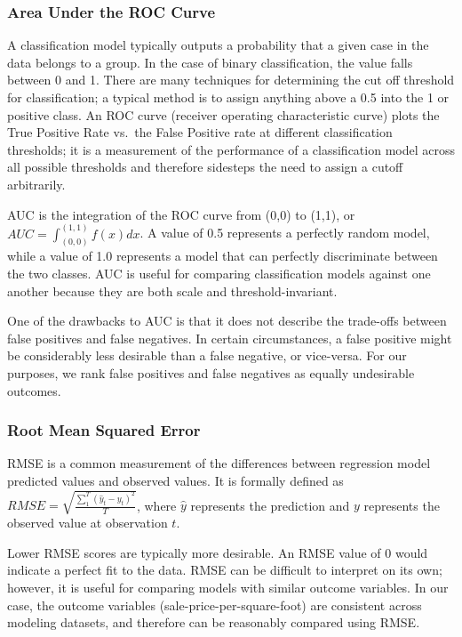 \documentclass[12pt,]{article}
\begin{document}
\hypertarget{area-under-the-roc-curve}{%
\subsubsection{Area Under the ROC
Curve}\label{area-under-the-roc-curve}}

A classification model typically outputs a probability that a given case
in the data belongs to a group. In the case of binary classification,
the value falls between 0 and 1. There are many techniques for
determining the cut off threshold for classification; a typical method
is to assign anything above a 0.5 into the 1 or positive class. An ROC
curve (receiver operating characteristic curve) plots the True Positive
Rate vs.~the False Positive rate at different classification thresholds;
it is a measurement of the performance of a classification model across
all possible thresholds and therefore sidesteps the need to assign a
cutoff arbitrarily.

AUC is the integration of the ROC curve from (0,0) to (1,1), or
\(AUC = \int_{(0,0)}^{(1,1)} f(x)dx\). A value of 0.5 represents a
perfectly random model, while a value of 1.0 represents a model that can
perfectly discriminate between the two classes. AUC is useful for
comparing classification models against one another because they are
both scale and threshold-invariant.

One of the drawbacks to AUC is that it does not describe the trade-offs
between false positives and false negatives. In certain circumstances, a
false positive might be considerably less desirable than a false
negative, or vice-versa. For our purposes, we rank false positives and
false negatives as equally undesirable outcomes.

\hypertarget{root-mean-squared-error}{%
\subsubsection{Root Mean Squared Error}\label{root-mean-squared-error}}

RMSE is a common measurement of the differences between regression model
predicted values and observed values. It is formally defined as
\(RMSE = \sqrt{ \frac{\sum_{1}^{T} (\hat{y}_t - y_t)^2}{T} }\), where
\(\hat{y}\) represents the prediction and \(y\) represents the observed
value at observation \(t\).

Lower RMSE scores are typically more desirable. An RMSE value of 0 would
indicate a perfect fit to the data. RMSE can be difficult to interpret
on its own; however, it is useful for comparing models with similar
outcome variables. In our case, the outcome variables
(sale-price-per-square-foot) are consistent across modeling datasets,
and therefore can be reasonably compared using RMSE.
\end{document}
